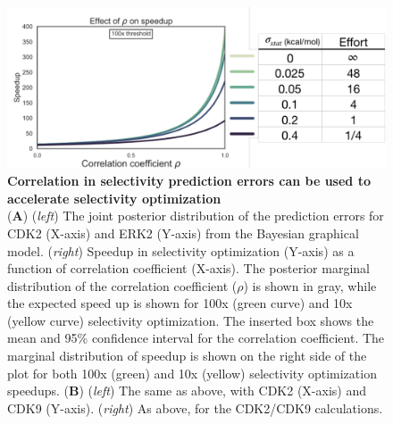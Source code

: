 \documentclass[9pt,lineno]{elife-modified} %
\begin{document}
\begin{figure}
	\begin{fullwidth}
		\begin{centering}
			\includegraphics[width=1.0\linewidth]{figures/figure6.pdf}
		\end{centering}
		\caption{
			\label{fig:figure-5}
			{\bf Correlation in selectivity prediction errors can be used to accelerate selectivity optimization} \\
			({\bf A}) (\emph{left}) The joint posterior distribution of the prediction errors for CDK2 (X-axis) and ERK2 (Y-axis) from the Bayesian graphical model. (\emph{right}) Speedup in selectivity optimization (Y-axis) as a function of correlation coefficient (X-axis). The posterior marginal distribution of the correlation coefficient ($\rho$) is shown in gray, while the expected speed up is shown for 100x (green curve) and 10x (yellow curve) selectivity optimization. The inserted box shows the mean and 95\% confidence interval for the correlation coefficient. The marginal distribution of speedup is shown on the right side of the plot for both 100x (green) and 10x (yellow) selectivity optimization speedups. 
			({\bf B}) (\emph{left}) The same as above, with CDK2 (X-axis) and CDK9 (Y-axis). (\emph{right}) As above, for the CDK2/CDK9 calculations.}
	\end{fullwidth}
\end{figure}

%
%
%
%
\end{document}

